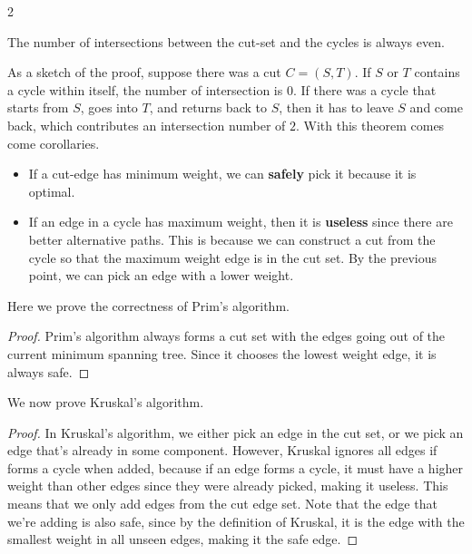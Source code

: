 \begin{multicols}{2}
\begin{theorem}
    The number of intersections between the cut-set and the cycles is always even. 
\end{theorem}

As a sketch of the proof, suppose there was a cut $C = (S,T)$. If $S$ or $T$ contains a cycle within itself, the number of intersection is $0$. If there was a cycle that starts from $S$, goes into $T$, and returns back to $S$, then it has to leave $S$ and come back, which contributes an intersection number of $2$. With this theorem comes come corollaries. 
\begin{itemize}
    \item If a cut-edge has minimum weight, we can \textbf{safely} pick it because it is optimal. 
    \item If an edge in a cycle has maximum weight, then it is \textbf{useless} since there are better alternative paths. This is because we can construct a cut from the cycle so that the maximum weight edge is in the cut set. By the previous point, we can pick an edge with a lower weight.  
\end{itemize}

Here we prove the correctness of Prim's algorithm. 
\begin{proof}
    Prim's algorithm always forms a cut set with the edges going out of the current minimum spanning tree. Since it chooses the lowest weight edge, it is always safe. 
\end{proof}
We now prove Kruskal's algorithm. 
\begin{proof}
    In Kruskal's algorithm, we either pick an edge in the cut set, or we pick an edge that's already in some component. However, Kruskal ignores all edges if forms a cycle when added, because if an edge forms a cycle, it must have a higher weight than other edges since they were already picked, making it useless. This means that we only add edges from the cut edge set. Note that the edge that we're adding is also safe, since by the definition of Kruskal, it is the edge with the smallest weight in all unseen edges, making it the safe edge. 
\end{proof}
\end{multicols}
